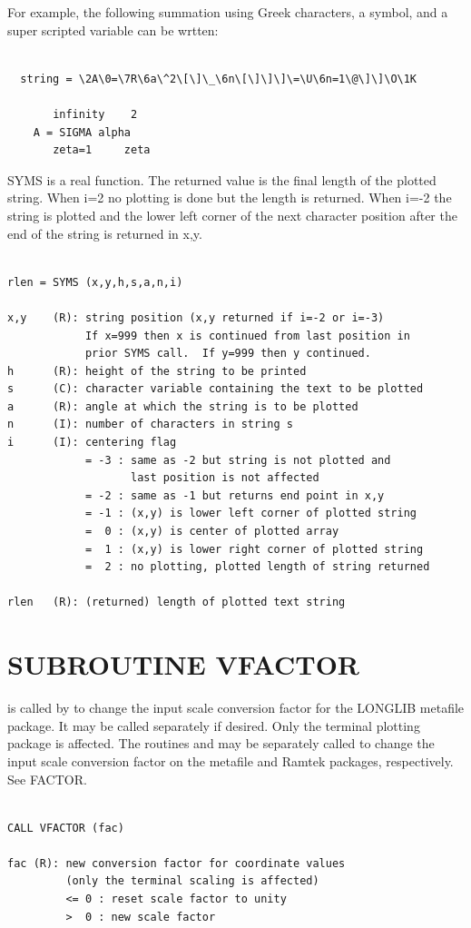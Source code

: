 \documentclass[11pt]{report}
\begin{document}
For example, the following summation using Greek characters, a
 symbol, and a super scripted variable can be wrtten:
\begin{verbatim}

  string = \2A\0=\7R\6a\^2\[\]\_\6n\[\]\]\]\=\U\6n=1\@\]\]\O\1K

       infinity    2
    A = SIGMA alpha
       zeta=1     zeta
\end{verbatim}

SYMS is a real function.  The returned value is the final length of the
plotted string.  When i=2 no plotting is done but the length is returned.
When i=-2 the string is plotted and the lower left corner of the next
character position after the end of the string is returned in x,y.
\begin{verbatim}

rlen = SYMS (x,y,h,s,a,n,i)

x,y    (R): string position (x,y returned if i=-2 or i=-3)
            If x=999 then x is continued from last position in
            prior SYMS call.  If y=999 then y continued.
h      (R): height of the string to be printed
s      (C): character variable containing the text to be plotted
a      (R): angle at which the string is to be plotted 
n      (I): number of characters in string s
i      (I): centering flag
            = -3 : same as -2 but string is not plotted and
                   last position is not affected
            = -2 : same as -1 but returns end point in x,y
            = -1 : (x,y) is lower left corner of plotted string
            =  0 : (x,y) is center of plotted array
            =  1 : (x,y) is lower right corner of plotted string
            =  2 : no plotting, plotted length of string returned

rlen   (R): (returned) length of plotted text string
\end{verbatim}


\section{SUBROUTINE VFACTOR}

 is called by  to change the input scale conversion factor
for the LONGLIB metafile package.  It may be called separately if desired.
Only the terminal plotting package
is affected.  The routines  and  may be separately 
called to change the input scale conversion factor on the metafile and
Ramtek packages, respectively.  See FACTOR.
\begin{verbatim}

CALL VFACTOR (fac)

fac (R): new conversion factor for coordinate values
         (only the terminal scaling is affected)
         <= 0 : reset scale factor to unity
         >  0 : new scale factor
\end{verbatim}
\end{document}
